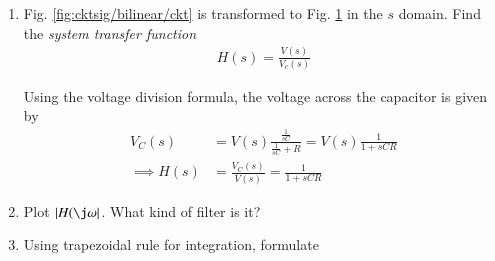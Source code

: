 \documentclass[journal,12pt,twocolumn]{IEEEtran}
\renewcommand\thesection{\arabic{section}}
\begin{document}
\begin{enumerate}[label=\arabic*.,ref=\thesection.\theenumi]
\item Fig. \ref{fig:cktsig/bilinear/ckt} is transformed to 
Fig. \ref{fig:cktsig/bilinear/sckt} in the $s$ domain.
		Find  the {\em system transfer function}
\begin{align}
	H(s) = \frac{V(s)}{V_c(s)}
\end{align}
\begin{figure}[!htb]
    \begin{center}
	    
    \end{center}
\caption{}
\label{fig:cktsig/bilinear/sckt}
\end{figure}
\solution 
Using the voltage division formula, the voltage across 
the capacitor is given by
\begin{align}
    V_C(s) &= V(s)\frac{\frac{1}{sC}}{\frac{1}{sC} + R} 
           = V(s)\frac{1}{1 + sCR}
           \label{eq:cktsig/bilinear/vcs} \\
	\implies H(s) &= \frac{V_C(s)}{V(s)} = \frac{1}{1 + sCR}
    \label{eq:cktsig/bilinear/hs}
\end{align}
\item Plot $\abs{H(\j\omega}$. What kind of filter is it?
	\\
\solution 

\item Using trapezoidal rule for integration, formulate 

\end{enumerate}
\end{document}
